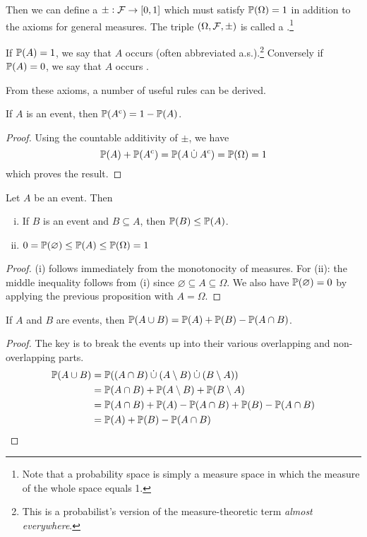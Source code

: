 \documentclass{article}
\begin{document}
Then we can define a  $\pm : \mathcal{F} \to [0,1]$ which must satisfy $\mathbb{P}(\Omega) = 1$ in addition to the axioms for general measures.
The triple $(\Omega, \mathcal{F}, \pm)$ is called a .\footnote{
    Note that a probability space is simply a measure space in which the measure of the whole space equals 1.
}

If $\mathbb{P}(A) = 1$, we say that $A$ occurs  (often abbreviated a.s.).\footnote{
    This is a probabilist's version of the measure-theoretic term \textit{almost everywhere}.
}
Conversely if $\mathbb{P}(A) = 0$, we say that $A$ occurs .

From these axioms, a number of useful rules can be derived.
\begin{proposition}
If $A$ is an event, then $\mathbb{P}(A^\text{c}) = 1 - \mathbb{P}(A)$.
\end{proposition}
\begin{proof}
Using the countable additivity of $\pm$, we have
\[\mathbb{P}(A) + \mathbb{P}(A^\text{c}) = \mathbb{P}(A \mathbin{\dot{\cup}} A^\text{c}) = \mathbb{P}(\Omega) = 1\]
which proves the result.
\end{proof}

\begin{proposition}
Let $A$ be an event. Then
\begin{enumerate}[(i)]
\item If $B$ is an event and $B \subseteq A$, then $\mathbb{P}(B) \leq \mathbb{P}(A)$.
\item $0 = \mathbb{P}(\varnothing) \leq \mathbb{P}(A) \leq \mathbb{P}(\Omega) = 1$
\end{enumerate}
\end{proposition}
\begin{proof}
(i) follows immediately from the monotonocity of measures.
For (ii): the middle inequality follows from (i) since $\varnothing \subseteq A \subseteq \Omega$.
We also have $\mathbb{P}(\varnothing) = 0$ by applying the previous proposition with $A = \Omega$.
\end{proof}

\begin{proposition}
If $A$ and $B$ are events, then $\mathbb{P}(A \cup B) = \mathbb{P}(A) + \mathbb{P}(B) - \mathbb{P}(A \cap B)$.
\end{proposition}
\begin{proof}
The key is to break the events up into their various overlapping and non-overlapping parts.
\begin{align*}
\mathbb{P}(A \cup B) &= \mathbb{P}((A \cap B) \mathbin{\dot{\cup}} (A \setminus B) \mathbin{\dot{\cup}} (B \setminus A)) \\
&= \mathbb{P}(A \cap B) + \mathbb{P}(A \setminus B) + \mathbb{P}(B \setminus A) \\
&= \mathbb{P}(A \cap B) + \mathbb{P}(A) - \mathbb{P}(A \cap B) + \mathbb{P}(B) - \mathbb{P}(A \cap B) \\
&= \mathbb{P}(A) + \mathbb{P}(B) - \mathbb{P}(A \cap B)
\end{align*}
\end{proof}
\end{document}
